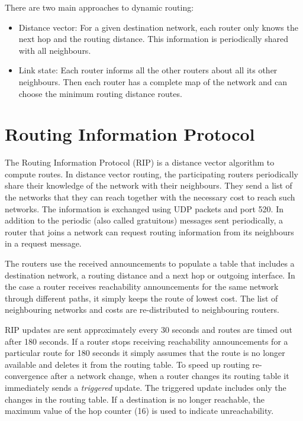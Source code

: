 There are two main approaches to dynamic routing:
\begin{itemize}
\item Distance vector: For a given destination network, each router only knows the next hop and the routing distance. 
This information is periodically shared with all neighbours.
\item Link state: Each router informs all the other routers about all its other neighbours.
Then each router has a complete map of the network and can choose the minimum routing distance routes.
\end{itemize}

\section{Routing Information Protocol}

The Routing Information Protocol (RIP) is a distance vector algorithm to compute routes.
In distance vector routing, the participating routers periodically share their knowledge of the network with their neighbours.
They send a list of the networks that they can reach together with the necessary cost to reach such networks.
The information is exchanged using UDP packets and port 520.
In addition to the periodic (also called gratuitous) messages sent periodically, a router that joins a network can request routing information from its neighbours in a request message.

The routers use the received announcements to populate a table that includes a destination network, a routing distance and a next hop or outgoing interface.
In the case a router receives reachability announcements for the same network through different paths, it simply keeps the route of lowest cost.
The list of neighbouring networks and costs are re-distributed to neighbouring routers.

RIP updates are sent approximately every 30 seconds and routes are timed out after 180 seconds.
If a router stops receiving reachability announcements for a particular route for 180 seconds it simply assumes that the route is no longer available and deletes it from the routing table.
To speed up routing re-convergence after a network change, when a router changes its routing table it immediately sends a \emph{triggered} update.
The triggered update includes only the changes in the routing table.
If a destination is no longer reachable, the maximum value of the hop counter (16) is used to indicate unreachability.

